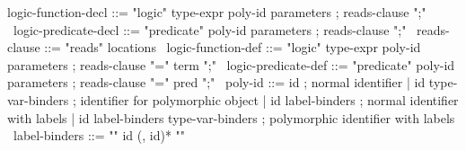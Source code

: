 \begin{syntax}
  logic-function-decl ::= "logic" type-expr poly-id parameters ;
                          reads-clause ";"
  \
  logic-predicate-decl ::= "predicate" poly-id parameters ;
                          reads-clause ";"
  \
  reads-clause ::= "reads" locations
  \
  logic-function-def ::= "logic" type-expr poly-id parameters ;
                   {reads-clause} "=" term ";"
  \
  logic-predicate-def ::= "predicate" poly-id parameters ; 
                          {reads-clause} "=" pred ";"
  \
  poly-id ::= id ; normal identifier
  | id type-var-binders ; identifier for polymorphic object
  | id {label-binders} ; normal identifier with labels
  | id {label-binders} type-var-binders ; polymorphic identifier with labels
  \
  label-binders ::= {"{" id (, id)* "}"}
\end{syntax}